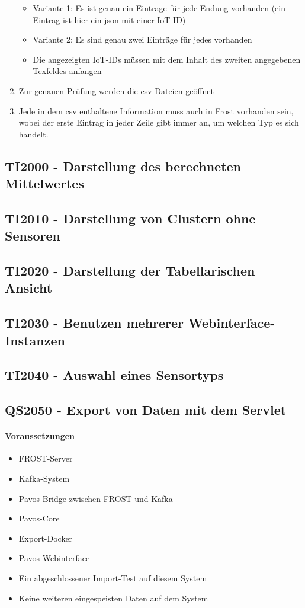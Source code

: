 \begin{enumerate}
\begin{itemize}
\item Variante 1: Es ist genau ein Eintrage für jede Endung vorhanden (ein Eintrag ist hier ein json mit einer IoT-ID)
\item Variante 2: Es sind genau zwei Einträge für jedes vorhanden
\item Die angezeigten IoT-IDs müssen mit dem Inhalt des zweiten angegebenen Texfeldes anfangen
\end{itemize}
\item Zur genauen Prüfung werden die csv-Dateien geöffnet
\item Jede in dem csv enthaltene Information muss auch in Frost vorhanden sein, wobei der erste Eintrag in jeder Zeile gibt immer an, um welchen Typ es sich handelt.
\end{enumerate}
\szenarioGood
\subsection{TI2000 - Darstellung des berechneten Mittelwertes}

\subsection{TI2010 - Darstellung von Clustern ohne Sensoren}

\subsection{TI2020 - Darstellung der Tabellarischen Ansicht}

\subsection{TI2030 - Benutzen mehrerer Webinterface-Instanzen}

\subsection{TI2040 - Auswahl eines Sensortyps}

\subsection{QS2050 - Export von Daten mit dem Servlet}
\paragraph{Voraussetzungen}
\begin{itemize}
\item FROST-Server
\item Kafka-System
\item Pavos-Bridge zwischen FROST und Kafka
\item Pavos-Core
\item Export-Docker
\item Pavos-Webinterface
\item Ein abgeschlossener Import-Test auf diesem System
\item Keine weiteren eingespeisten Daten auf dem System
\end{itemize}
